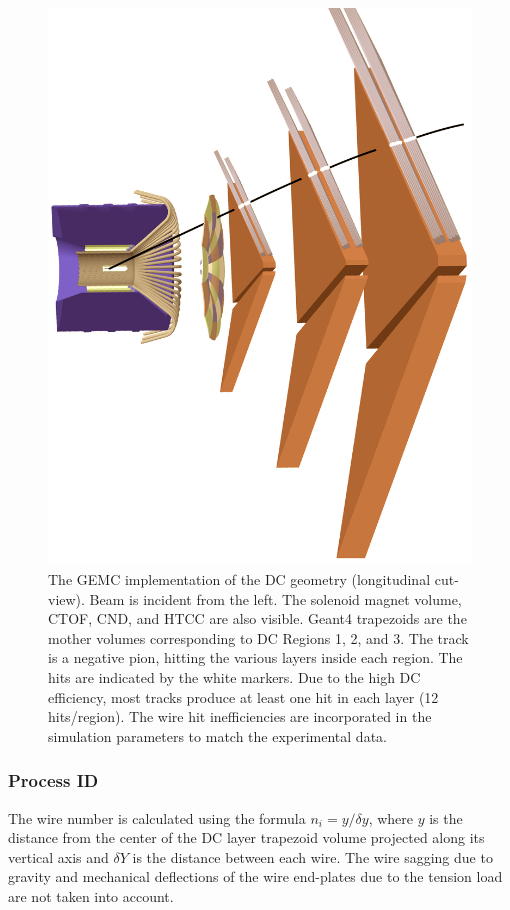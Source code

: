 \begin{figure}[h]
	\centering
	\includegraphics[width=0.99\columnwidth,keepaspectratio]{img/dcGeometry.png}
	\caption{The GEMC implementation of the DC geometry (longitudinal cut-view).
	         Beam is incident from the left. The solenoid magnet volume, CTOF, CND, and HTCC are also visible.
             Geant4 trapezoids are the mother volumes corresponding to DC Regions 1, 2, and 3.
             The track is a negative pion, hitting the various layers inside each region.
             The hits are indicated by the white markers. Due to the high DC
             efficiency, most tracks produce at least one hit in each layer (12 hits/region).
             The wire hit inefficiencies are incorporated in the simulation parameters to match the experimental data.}
	\label{fig:dcGeometry}
\end{figure}


\subsubsection{Process ID}
The wire number is calculated using the formula $n_i = y/\delta y$, where $y$ is the
distance from the center of the DC layer trapezoid volume projected along its vertical axis and $\delta Y$
is the distance between each wire.
The wire sagging due to gravity and mechanical deflections of the wire end-plates due to the tension
load are not taken into account.

